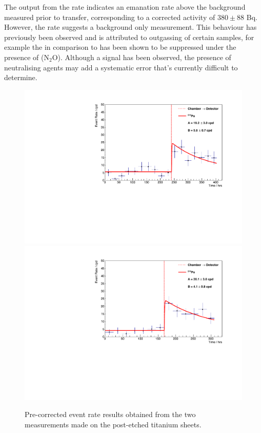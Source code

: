 The output from the \PoTOF{} rate indicates an emanation rate above the background measured prior to transfer, corresponding to a corrected activity of $380\pm88$ \micro{}Bq. However, the \PoTOE{} rate suggests a background only measurement. This behaviour has previously been observed and is attributed to outgassing of certain samples, for example the \PoTOE{} in comparison to \PoTOF{} has been shown to be suppressed under the presence of (N$_{2}$O). Although a signal has been observed, the presence of neutralising agents may add a systematic error that's currently difficult to determine. 
%
\begin{figure}[t!]
    \centering
    \includegraphics[scale=0.42]{Chapter_4/Figures/ucl_measurements/titanium_sheets_post_etching_1_Po214.pdf}
    \includegraphics[scale=0.42]{Chapter_4/Figures/ucl_measurements/titanium_sheets_post_etching_2_Po214.pdf}    
    \caption[Pre-corrected \PoTOF{} and \PoTOE{} event rate results obtained from the single measurement made on the pre-etched titanium sheets.]
    {Pre-corrected \PoTOF{} event rate results obtained from the two measurements made on the post-etched titanium sheets.}
    \label{fig:ti_post_etched_sheets_results}
\end{figure}
%

